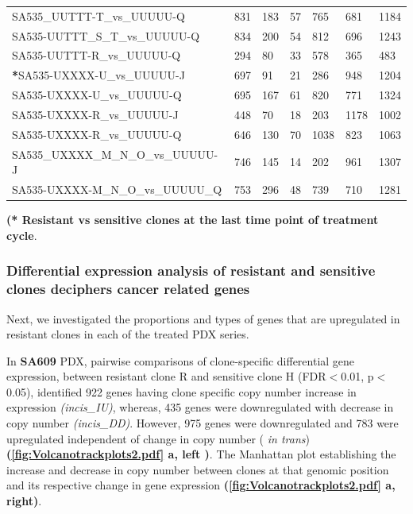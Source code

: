 \begin{landscape}
\begin{table}
{\begin{tabular}{|l|p{3.8em}|p{3.8em}|p{3.8em}|p{3.8em}|p{3.8em}|p{3.8em}|}
SA535\_UUTTT-T\_vs\_UUUUU-Q        & 831 & 183 & 57  & 765  & 681  & 1184 \\
SA535-UUTTT\_S\_T\_vs\_UUUUU-Q     & 834 & 200 & 54  & 812  & 696  & 1243 \\
SA535-UUTTT-R\_vs\_UUUUU-Q         & 294 & 80  & 33  & 578  & 365  & 483  \\
\textbf{*}SA535-UXXXX-U\_vs\_UUUUU-J         & 697 & 91  & 21  & 286  & 948  & 1204 \\
SA535-UXXXX-U\_vs\_UUUUU-Q         & 695 & 167 & 61  & 820  & 771  & 1324 \\
SA535-UXXXX-R\_vs\_UUUUU-J         & 448 & 70  & 18  & 203  & 1178 & 1002 \\
SA535-UXXXX-R\_vs\_UUUUU-Q         & 646 & 130 & 70  & 1038 & 823  & 1063 \\
SA535\_UXXXX\_M\_N\_O\_vs\_UUUUU-J & 746 & 145 & 14  & 202  & 961  & 1307 \\
SA535-UXXXX-M\_N\_O\_vs\_UUUUU\_Q  & 753 & 296 & 48  & 739  & 710  & 1281 \\
  \hline

\end{tabular}
}

\label{tab:numberofDEgenesincistrans}

  \small\textbf{(* Resistant vs sensitive clones at the last time point of treatment cycle}.
\end{table}
\end{landscape}


 \subsubsection{Differential expression analysis of resistant and sensitive clones deciphers cancer related genes}
 Next, we investigated the proportions and types of genes that are upregulated in resistant clones in each of the treated PDX series.
 
 In \textbf{SA609} PDX, pairwise comparisons of clone-specific differential gene expression, between resistant clone R and sensitive clone H (FDR$<$0.01, p$<$0.05), identified 922 genes having clone specific copy number increase in expression \textit{(incis\_IU)}, whereas, 435 genes were downregulated with decrease in copy number \textit{(incis\_DD)}. However, 975 genes were downregulated and 783 were upregulated independent of change in copy number ( \textit{in trans}) \textbf{(\autoref{fig:Volcanotrackplots2.pdf} a, left )}. The Manhattan plot establishing the increase and decrease in copy number between clones at that genomic position and its respective change in gene expression \textbf{(\autoref{fig:Volcanotrackplots2.pdf} a, right)}.
 
